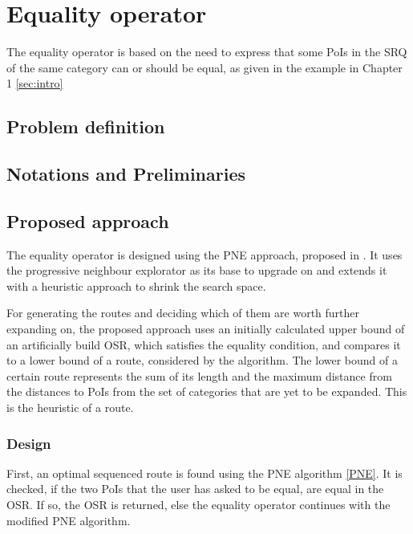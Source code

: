 \section{Equality operator}
The equality operator is based on the need to express that some PoIs in the SRQ of the same category can or should be equal, as given in the example in Chapter 1 \ref{sec:intro}

\subsection{Problem definition} 
\label{sec:problem}

\subsection{Notations and Preliminaries} 
\label{sec:notes}

\subsection{Proposed approach} 
\label{sec:approach}
The equality operator is designed using the PNE approach, proposed in \cite{OSR}. It uses the progressive neighbour explorator as  its base to upgrade on and extends it with a heuristic approach to shrink the search space. \newline

For generating the routes and deciding which of them are worth further expanding on, the proposed approach uses an initially calculated upper bound of an artificially build OSR, which satisfies the equality condition, and compares it to a lower bound of a route, considered by the algorithm. The lower bound of a certain route represents the sum of its length and the maximum distance from the distances to PoIs from the set of categories that are yet to be expanded. This is the heuristic of a route.

\subsubsection{Design}
\label{sec:design}
First, an optimal sequenced route is found using the PNE algorithm \ref{PNE}. It is checked, if the two PoIs that the user has asked to be equal, are equal in the OSR. If so, the OSR is returned, else the equality operator continues with the modified PNE algorithm.

